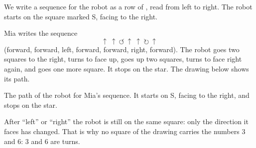 We write a sequence for the robot as a row of , read from left to
right. The robot starts on the square marked S, facing to the right.

\begin{example}\label{ex:g1:instructions-in-order:star}
Mia writes the sequence
\[
\uparrow\ \uparrow\ \circlearrowleft\ \uparrow\ \uparrow\ \circlearrowright\ \uparrow
\]
(forward, forward, left, forward, forward, right, forward). The robot goes two
squares to the right, turns to face up, goes up two squares, turns to face
right again, and goes one more square. It stops on the star. The drawing below
shows its path.
\end{example}

\begin{omfigure}

{\small The path of the robot for Mia's sequence. It starts on S, facing to
the right, and stops on the star.}
\label{fig:g1:instructions-in-order:grid}
\end{omfigure}

\begin{remark}\label{rem:g1:instructions-in-order:turn}
After ``left'' or ``right'' the robot is still on the same square: only the
direction it faces has changed. That is why no square of the drawing carries
the numbers 3 and 6:  3 and 6 are turns.
\end{remark}

